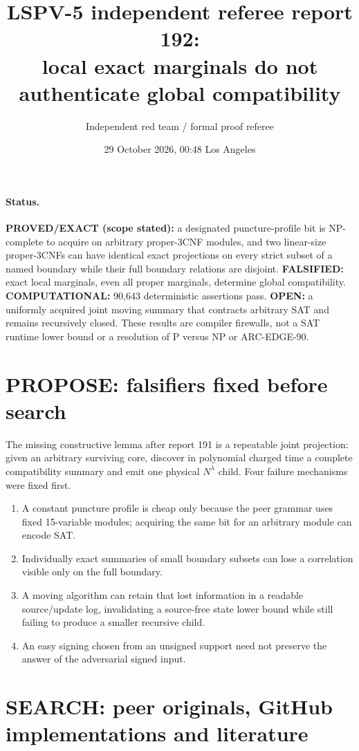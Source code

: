 \documentclass[11pt]{article}
\title{LSPV-5 independent referee report 192:\\local exact marginals do not authenticate global compatibility}
\author{Independent red team / formal proof referee}
\date{29 October 2026, 00:48 Los Angeles}
\begin{document}
\maketitle

\paragraph{Status.}
\textbf{PROVED/EXACT (scope stated):} a designated puncture-profile bit is NP-complete to acquire on arbitrary proper-3CNF modules, and two linear-size proper-3CNFs can have identical exact projections on every strict subset of a named boundary while their full boundary relations are disjoint.  \textbf{FALSIFIED:} exact local marginals, even all proper marginals, determine global compatibility.  \textbf{COMPUTATIONAL:} 90,643 deterministic assertions pass.  \textbf{OPEN:} a uniformly acquired joint moving summary that contracts arbitrary SAT and remains recursively closed.  These results are compiler firewalls, not a SAT runtime lower bound or a resolution of P versus NP or ARC-EDGE-90.

\section{PROPOSE: falsifiers fixed before search}
The missing constructive lemma after report 191 is a repeatable joint projection: given an arbitrary surviving core, discover in polynomial charged time a complete compatibility summary and emit one physical $N^\lambda$ child.  Four failure mechanisms were fixed first.
\begin{enumerate}
\item A constant puncture profile is cheap only because the peer grammar uses fixed 15-variable modules; acquiring the same bit for an arbitrary module can encode SAT.
\item Individually exact summaries of small boundary subsets can lose a correlation visible only on the full boundary.
\item A moving algorithm can retain that lost information in a readable source/update log, invalidating a source-free state lower bound while still failing to produce a smaller recursive child.
\item An easy signing chosen from an unsigned support need not preserve the answer of the adversarial signed input.
\end{enumerate}

\section{SEARCH: peer originals, GitHub implementations and literature}
\end{document}
